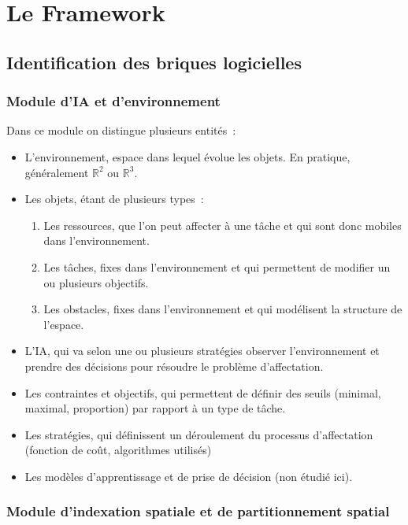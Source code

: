 \section{Le Framework}

\subsection{Identification des briques logicielles}

%
\subsubsection{Module d'IA et d'environnement}

Dans ce module on distingue plusieurs entités~:
\renewcommand{\labelitemi}{$\bullet$}
\begin{itemize}
\setlength{\itemsep}{5pt}
\item L'environnement, espace dans lequel évolue les objets. En pratique, généralement $\mathbb{R}^2$ ou $\mathbb{R}^3$.
\item Les objets, étant de plusieurs types~:
	\begin{enumerate}
	\item Les ressources, que l'on peut affecter à une tâche et qui sont donc mobiles dans l'environnement.
	\item Les tâches, fixes dans l'environnement et qui permettent de modifier un ou plusieurs objectifs.
	\item Les obstacles, fixes dans l'environnement et qui modélisent la structure de l'espace.
	\end{enumerate}
\item L'IA, qui va selon une ou plusieurs stratégies observer l'environnement et prendre des décisions pour résoudre le problème d'affectation.
\item Les contraintes et objectifs, qui permettent de définir des seuils (minimal, maximal, proportion) par rapport à un type de tâche.
\item Les stratégies, qui définissent un déroulement du processus d'affectation (fonction de coût, algorithmes utilisés)
\item Les modèles d'apprentissage et de prise de décision (non étudié ici).
\end{itemize} %

%
\subsubsection{Module d'indexation spatiale et de partitionnement spatial}

